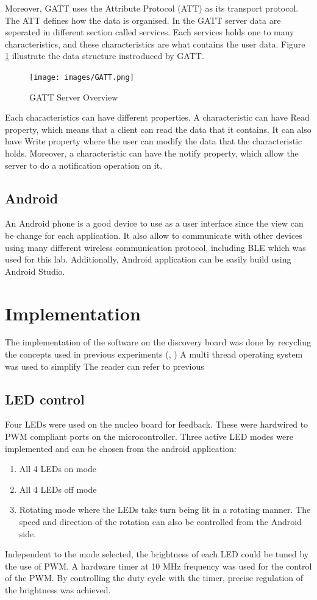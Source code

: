 \documentclass[12pt]{article}
\begin{document}
Moreover, GATT uses the Attribute Protocol (ATT) as its transport protocol. The ATT defines how the data is organised. In the GATT server data are seperated in different section called services. Each services holds one to many characteristics, and these characteristics are what contains the user data. Figure \ref{fig:gatt} illustrate the data structure instroduced by GATT.

\begin{figure}[!htb]
 \centering
 \texttt{[image: images/GATT.png]}
 \caption{GATT Server Overview}
 \label{fig:gatt}
\end{figure}

Each characteristics can have different properties. A characteristic can have Read property, which means that a client can read the data that it contains. It can also have Write property where the user can modify the data that the characteristic holds. Moreover, a characteristic can have the notify property, which allow the server to do a notification operation on it.

\subsection{Android}
An Android phone is a good device to use as a user interface since the view can be change for each application. It also allow to communicate with other devices using many different wireless communication protocol, including BLE which was used for this lab. Additionally, Android application can be easily build using Android Studio.

\section{Implementation}
The implementation of the software on the discovery board was done by recycling the concepts used in previous experiments (\cite{Lab2report}, \cite{Lab4report}) A multi thread operating system was used to simplify The reader can refer to previous

\subsection{LED control}
Four LEDs were used on the nucleo board for feedback. These were hardwired to PWM compliant ports on the microcontroller. Three active LED modes were implemented and can be chosen from the android application:
\begin{enumerate}
\item All 4 LEDs on mode
\item All 4 LEDs off mode
\item Rotating mode where the LEDs take turn being lit in a rotating manner. The speed and direction of the rotation can also be controlled from the Android side. 
\end{enumerate}
Independent to the mode selected, the brightness of each LED could be tuned by the use of PWM. A hardware timer at 10 MHz frequency was used for the control of the PWM. By controlling the duty cycle with the timer, precise regulation of the brightness was achieved.
\end{document}
